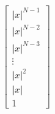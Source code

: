 \documentclass{article}
\begin{document}
\begin{align*}
\begin{bmatrix}
                                                                                                                                                |x|^{N - 1} \\
                                                                                                                                                |x|^{N - 2} \\
                                                                                                                                                |x|^{N - 3} \\
                                                                                                                                                \vdots \\
                                                                                                                                                |x|^{2} \\
                                                                                                                                                |x| \\
                                                                                                                                                1
                                                                                                                                            \end{bmatrix} \\
\end{align*}
\end{document}
